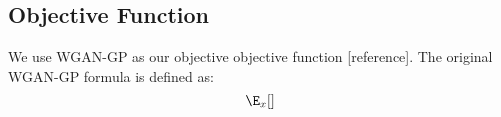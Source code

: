\subsection{Objective Function}
We use WGAN-GP as our objective objective function [reference]. The original WGAN-GP formula is defined as:
\begin{equation}
\E_x[]
\end{equation}